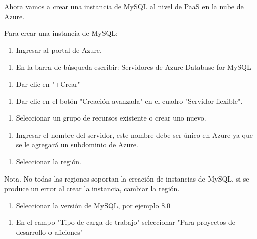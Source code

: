 Ahora vamos a crear una instancia de MySQL al nivel de PaaS en la nube de Azure.

Para crear una instancia de MySQL:

\begin{enumerate}
\item Ingresar al portal de Azure.
\end{enumerate}

\begin{enumerate}
\item En la barra de búsqueda escribir: Servidores de Azure Database for MySQL
\end{enumerate}

\begin{enumerate}
\item Dar clic en "+Crear"
\end{enumerate}

\begin{enumerate}
\item Dar clic en el botón "Creación avanzada" en el cuadro "Servidor flexible".
\end{enumerate}

\begin{enumerate}
\item Seleccionar un grupo de recursos existente o crear uno nuevo.
\end{enumerate}

\begin{enumerate}
\item Ingresar el nombre del servidor, este nombre debe ser único en Azure ya que se le agregará un subdominio de Azure.
\end{enumerate}

\begin{enumerate}
\item Seleccionar la región.
\end{enumerate}

Nota. No todas las regiones soportan la creación de instancias de MySQL, si se produce un error al crear la instancia, cambiar la región.

\begin{enumerate}
\item Seleccionar la versión de MySQL, por ejemplo 8.0
\end{enumerate}

\begin{enumerate}
\item En el campo "Tipo de carga de trabajo" seleccionar "Para proyectos de desarrollo o aficiones"
\end{enumerate}

